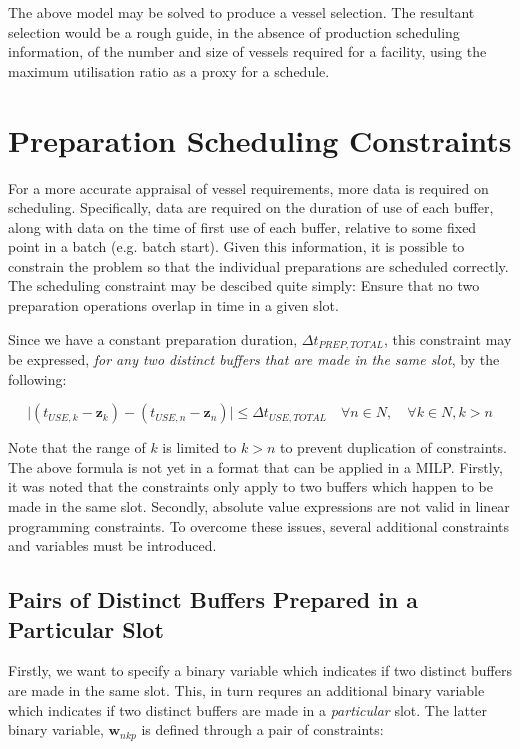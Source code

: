 The above model may be solved to produce a vessel selection.
The resultant selection would be a rough guide, in the absence of production
scheduling information, of the number and size of vessels required for a 
facility, using the maximum utilisation ratio as a proxy for a schedule.

\section{Preparation Scheduling Constraints}\label{S.prepsched}

For a more accurate appraisal of vessel requirements, more data is required
on scheduling.
Specifically, data are required on the duration of use of each buffer, along
with data on the time of first use of each buffer, relative to some fixed point
in a batch (e.g. batch start).
Given this information, it is possible to constrain the problem so that the
individual preparations are scheduled correctly.
The scheduling constraint may be descibed quite simply:
Ensure that no two preparation operations overlap in time in a given slot.

Since we have a constant preparation duration, $ \Delta t_{PREP,TOTAL} $, this
constraint may be expressed, \emph{for any two distinct buffers that are made
in the same slot}, by the following:

\begin{equation}
    \lvert \left( t_{USE,k} - \boldsymbol{z}_{k} \right) - \left( t_{USE,n} - 
    \boldsymbol{z}_{n} \right) \rvert \le \Delta t_{USE,TOTAL} \quad \forall n 
    \in N, \quad \forall k \in N, k > n
\end{equation}

Note that the range of $ k $ is limited to $ k > n $ to prevent duplication
of constraints.
The above formula is not yet in a format that can be applied in a MILP.
Firstly, it was noted that the constraints only apply to two buffers which
happen to be made in the same slot.
Secondly, absolute value expressions are not valid in linear programming
constraints.
To overcome these issues, several additional constraints and variables must be
introduced.

\subsection{Pairs of Distinct Buffers Prepared in a Particular Slot}\label{SS.constr6}

Firstly, we want to specify a binary variable which indicates if two distinct
buffers are made in the same slot.  
This, in turn requres an additional binary variable which indicates if two
distinct buffers are made in a \emph{particular} slot.
The latter binary variable, $ \boldsymbol{w}_{nkp} $ is defined through a pair
of constraints:

